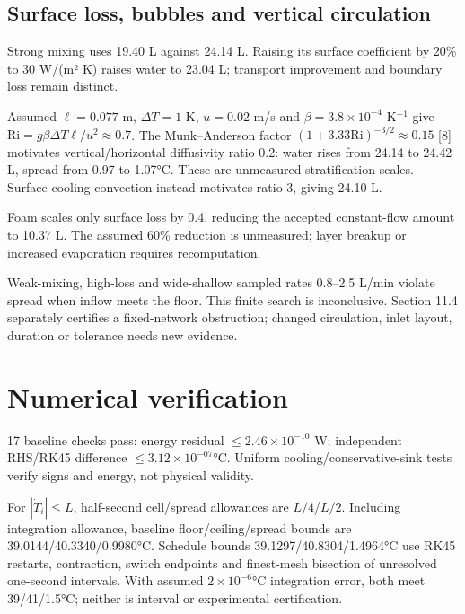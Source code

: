 \documentclass[12pt,a4paper]{article}
\begin{document}
\subsection{Surface loss, bubbles and vertical circulation}
Strong mixing uses 19.40 L against 24.14 L. Raising its surface coefficient by 20\% to 30 W/(m² K) raises water to 23.04 L; transport improvement and boundary loss remain distinct.

Assumed $\ell=0.077$ m, $\Delta T=1$ K, $u=0.02$ m/s and $\beta=3.8\times10^{-4}$ K$^{-1}$ give $\mathrm{Ri}=g\beta\Delta T\ell/u^2\approx0.7$. The Munk–Anderson factor $(1+3.33\mathrm{Ri})^{-3/2}\approx0.15$ [8] motivates vertical/horizontal diffusivity ratio 0.2: water rises from 24.14 to 24.42 L, spread from 0.97 to 1.07°C. These are unmeasured stratification scales. Surface-cooling convection instead motivates ratio 3, giving 24.10 L.

Foam scales only surface loss by 0.4, reducing the accepted constant-flow amount to 10.37 L. The assumed 60\% reduction is unmeasured; layer breakup or increased evaporation requires recomputation.

Weak-mixing, high-loss and wide-shallow sampled rates 0.8–2.5 L/min violate spread when inflow meets the floor. This finite search is inconclusive. Section 11.4 separately certifies a fixed-network obstruction; changed circulation, inlet layout, duration or tolerance needs new evidence.

\section{Numerical verification}
17 baseline checks pass: energy residual $\leq$$2.46\times10^{-10}$ W; independent RHS/RK45 difference $\leq$$3.12\times10^{-07}$°C. Uniform cooling/conservative-sink tests verify signs and energy, not physical validity.

For $|\dot T_i|\le L$, half-second cell/spread allowances are $L/4$/$L/2$. Including integration allowance, baseline floor/ceiling/spread bounds are 39.0144/40.3340/0.9980°C. Schedule bounds 39.1297/40.8304/1.4964°C use RK45 restarts, contraction, switch endpoints and finest-mesh bisection of unresolved one-second intervals. With assumed $2\times10^{-6}$°C integration error, both meet 39/41/1.5°C; neither is interval or experimental certification.
\end{document}
